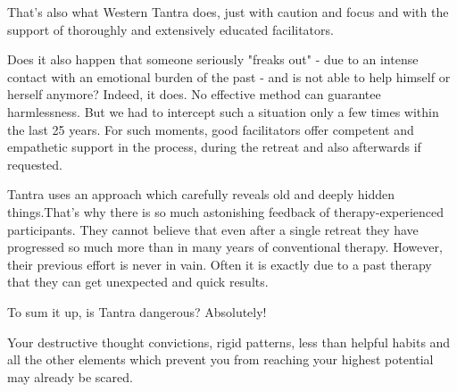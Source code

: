 That's also what Western Tantra does, just with caution and focus and with the support of thoroughly and extensively educated facilitators.

Does it also happen that someone seriously "freaks out" - due to an intense contact with an emotional burden of the past - and is not able to help himself or herself anymore? Indeed, it does. No effective method can guarantee harmlessness. But we had to intercept such a situation only a few times within the last 25 years. For such moments, good facilitators offer competent and empathetic support in the process, during the retreat and also afterwards if requested.

Tantra uses an approach which carefully reveals old and deeply hidden things.That's why there is so much astonishing feedback of therapy-experienced participants. They cannot believe that even after a single retreat they have progressed so much more than in many years of conventional therapy. However, their previous effort is never in vain. Often it is exactly due to a past therapy that they can get unexpected and quick results.

To sum it up, is Tantra  dangerous? Absolutely!

Your destructive thought convictions, rigid patterns, less than helpful habits and all the other elements which prevent you from reaching your highest potential may already be scared.
